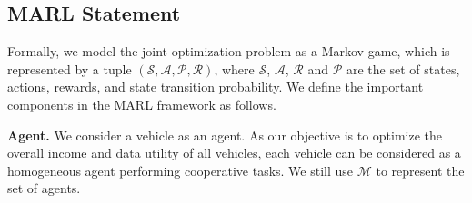\subsection{MARL Statement}
Formally, we model the joint optimization problem as a Markov game, which is represented by a
tuple $(\mathcal{S}, \mathcal{A}, \mathcal{P}, \mathcal{R})$, where $\mathcal{S}$, $\mathcal{A}$, $\mathcal{R}$ and $\mathcal{P}$ are the set of states, actions, rewards, and state transition probability. We define the important components in the MARL framework as follows.



\noindent\textbf{Agent.} We consider a vehicle as an agent. As our objective is to optimize the overall income and data utility of all vehicles, each vehicle can be considered as a homogeneous agent performing cooperative tasks. We still use $\mathcal{M}$ to represent the set of agents.

